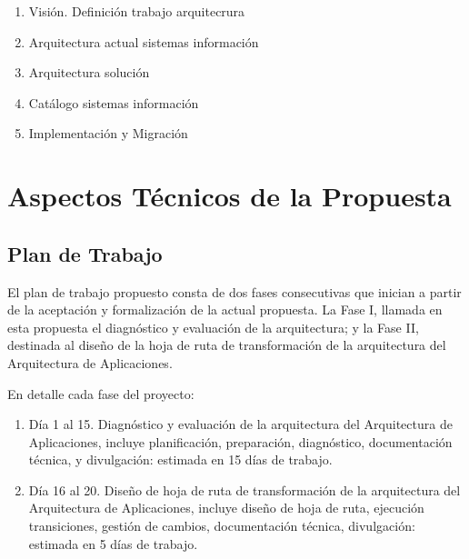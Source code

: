\documentclass[
	a4paper, %
	12pt, %
]{include/CSSullivanBusinessReport}
\def\tightlist{}
\begin{document}
\begin{quote}
\end{quote}

\begin{enumerate}
\def\labelenumi{\arabic{enumi}.}
\tightlist
\item
  Visión. Definición trabajo arquitecrura
\item
  Arquitectura actual sistemas información
\item
  Arquitectura solución
\item
  Catálogo sistemas información
\item
  Implementación y Migración
\end{enumerate}

\newpage

\section{Aspectos Técnicos de la
Propuesta}\label{sec:aspectos-tuxe9cnicos-de-la-propuesta}

\subsection{Plan de Trabajo}\label{sec:plan-de-trabajo}

\begin{quote}
\end{quote}

El plan de trabajo propuesto consta de dos fases consecutivas que
inician a partir de la aceptación y formalización de la actual
propuesta. La Fase I, llamada en esta propuesta el diagnóstico y
evaluación de la arquitectura; y la Fase II, destinada al diseño de la
hoja de ruta de transformación de la arquitectura del Arquitectura de
Aplicaciones.

En detalle cada fase del proyecto:

\begin{enumerate}
\def\labelenumi{\arabic{enumi}.}
\item
  Día 1 al 15. Diagnóstico y evaluación de la arquitectura del
  Arquitectura de Aplicaciones, incluye planificación, preparación,
  diagnóstico, documentación técnica, y divulgación: estimada en 15 días
  de trabajo.
\item
  Día 16 al 20. Diseño de hoja de ruta de transformación de la
  arquitectura del Arquitectura de Aplicaciones, incluye diseño de hoja
  de ruta, ejecución transiciones, gestión de cambios, documentación
  técnica, divulgación: estimada en 5 días de trabajo.
\end{enumerate}
\end{document}
